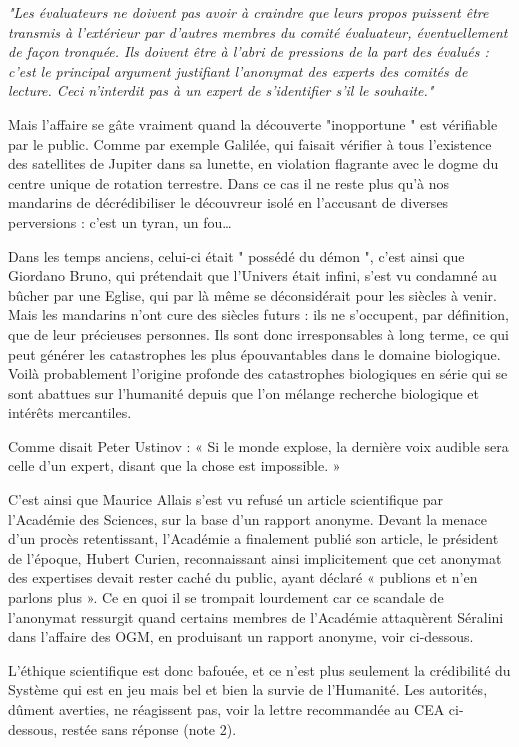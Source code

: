 \documentclass[a4paper,12pt]{article}
\begin{document}
\textit{"Les évaluateurs ne doivent pas avoir à craindre que leurs propos puissent être transmis à l'extérieur par d'autres membres du comité évaluateur, éventuellement de façon tronquée. Ils doivent être à l'abri de pressions de la part des évalués : c'est le principal argument justifiant l'anonymat des experts des comités de lecture. Ceci n'interdit pas à un expert de s'identifier s'il le souhaite."} 


Mais l’affaire se gâte vraiment quand la découverte "inopportune " est vérifiable par le public. Comme par exemple Galilée, qui faisait vérifier à tous l’existence des satellites de Jupiter dans sa lunette, en violation flagrante avec le dogme du centre unique de rotation terrestre. Dans ce cas il ne reste plus qu’à nos mandarins de décrédibiliser le découvreur isolé en l’accusant de diverses perversions : c’est un tyran, un fou… 

Dans les temps anciens, celui-ci était " possédé du démon ", c’est ainsi que Giordano Bruno, qui prétendait que l’Univers était infini, s’est vu condamné au bûcher par une Eglise, qui par là même se déconsidérait pour les siècles à venir. Mais les mandarins n’ont cure des siècles futurs : ils ne s’occupent, par définition, que de leur précieuses personnes. Ils sont donc irresponsables à long terme, ce qui peut générer les catastrophes les plus épouvantables dans le domaine biologique. Voilà probablement l’origine profonde des catastrophes biologiques en série qui se sont abattues sur l’humanité depuis que l’on mélange recherche biologique et intérêts mercantiles.

Comme disait Peter Ustinov : « Si le monde explose, la dernière voix audible sera celle d'un expert, disant que la chose est impossible. » 

C’est ainsi que Maurice Allais s’est vu refusé un article scientifique par l’Académie des Sciences, sur la base d’un rapport anonyme.  Devant la menace d’un procès retentissant, l'Académie a finalement publié son article, le président de l’époque, Hubert Curien, reconnaissant ainsi implicitement que cet anonymat des expertises devait rester caché du public,  ayant déclaré « publions et n’en parlons plus ». Ce en quoi il se trompait lourdement car ce scandale de l’anonymat ressurgit quand certains membres de l’Académie attaquèrent Séralini dans l’affaire des OGM, en produisant un rapport anonyme, voir ci-dessous. 


L’éthique scientifique est donc bafouée, et ce n’est plus seulement la crédibilité du Système qui est en jeu mais bel et bien la survie de l’Humanité. Les autorités, dûment averties, ne réagissent pas, voir la lettre recommandée au CEA ci-dessous, restée sans réponse (note 2).
\end{document}
